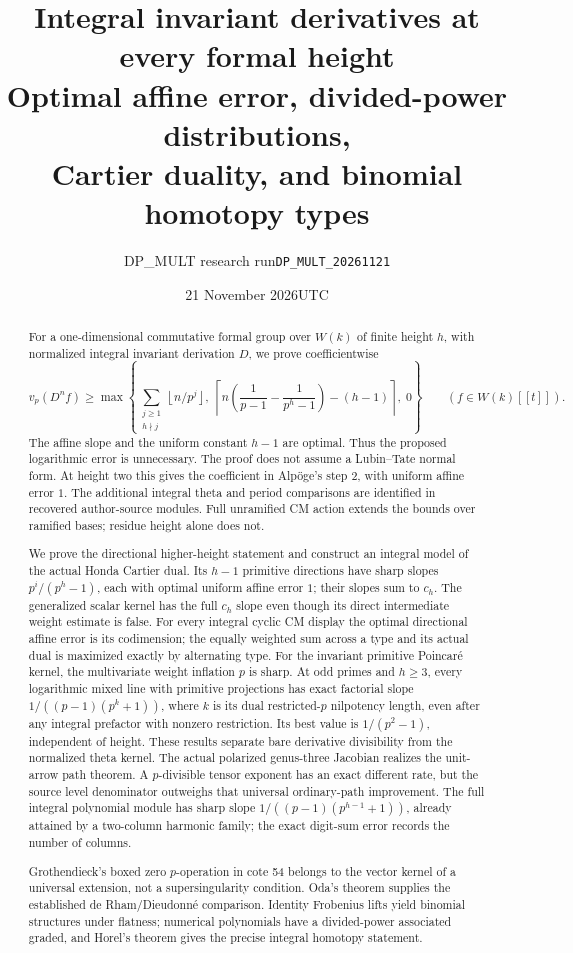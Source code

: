 \documentclass[11pt,a4paper]{article}
\title{Integral invariant derivatives at every formal height\\
\large Optimal affine error, divided-power distributions,\\Cartier duality, and binomial homotopy types}
\author{DP\_MULT research run\quad\texttt{DP\_MULT\_20261121}}
\date{21 November 2026\quad UTC}
\theoremstyle{definition}\newtheorem{remark}[theorem]{Remark}
\newcommand{\vp}{v_p}\newcommand{\dR}{\mathrm{dR}}\newcommand{\crys}{\mathrm{crys}}
\newcommand{\ceil}[1]{\left\lceil #1\right\rceil}\newcommand{\floor}[1]{\left\lfloor #1\right\rfloor}
\begin{document}
\maketitle
\begin{abstract}
For a one-dimensional commutative formal group over $W(k)$ of finite height $h$, with normalized integral invariant derivation $D$, we prove coefficientwise
\[
 \vp(D^n f)\ge
 \max\left\{\sum_{\substack{j\ge1\\h\nmid j}}\floor{n/p^j},\;
 \ceil{n\left(\frac1{p-1}-\frac1{p^h-1}\right)-(h-1)},\;0\right\}
 \qquad(f\in W(k)[[t]]).
\]
The affine slope and the uniform constant $h-1$ are optimal. Thus the proposed logarithmic error is unnecessary. The proof does not assume a Lubin--Tate normal form. At height two this gives the coefficient in Alp\"oge's step 2, with uniform affine error $1$. The additional integral theta and period comparisons are identified in recovered author-source modules. Full unramified CM action extends the bounds over ramified bases; residue height alone does not.

We prove the directional higher-height statement and construct an integral model of the actual Honda Cartier dual. Its $h-1$ primitive directions have sharp slopes $p^i/(p^h-1)$, each with optimal uniform affine error $1$; their slopes sum to $c_h$. The generalized scalar kernel has the full $c_h$ slope even though its direct intermediate weight estimate is false. For every integral cyclic CM display the optimal directional affine error is its codimension; the equally weighted sum across a type and its actual dual is maximized exactly by alternating type. For the invariant primitive Poincar\'e kernel, the multivariate weight inflation $p$ is sharp. At odd primes and $h\ge3$, every logarithmic mixed line with primitive projections has exact factorial slope $1/((p-1)(p^k+1))$, where $k$ is its dual restricted-$p$ nilpotency length, even after any integral prefactor with nonzero restriction. Its best value is $1/(p^2-1)$, independent of height. These results separate bare derivative divisibility from the normalized theta kernel. The actual polarized genus-three Jacobian realizes the unit-arrow path theorem. A $p$-divisible tensor exponent has an exact different rate, but the source level denominator outweighs that universal ordinary-path improvement. The full integral polynomial module has sharp slope $1/((p-1)(p^{h-1}+1))$, already attained by a two-column harmonic family; the exact digit-sum error records the number of columns.

Grothendieck's boxed zero $p$-operation in cote 54 belongs to the vector kernel of a universal extension, not a supersingularity condition. Oda's theorem supplies the established de Rham/Dieudonn\'e comparison. Identity Frobenius lifts yield binomial structures under flatness; numerical polynomials have a divided-power associated graded, and Horel's theorem gives the precise integral homotopy statement.


\end{abstract}
\end{document}
